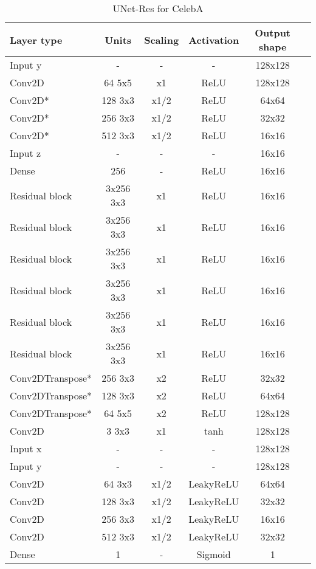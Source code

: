 \begin{table*}[h]
	\centering
	\begin{tabular}{|l|c|c|c|c|c|}
		\hline
		Layer type & Units & Scaling & Activation & Output shape\\
		\hline
		Input y & - & - & - & 128x128\\
		Conv2D & 64 5x5 & x1 & ReLU & 128x128 \\
		Conv2D* & 128 3x3 & x1/2 & ReLU & 64x64 \\
		Conv2D* & 256 3x3 & x1/2 & ReLU & 32x32 \\
		Conv2D* & 512 3x3 & x1/2 & ReLU & 16x16 \\
		Input z & - & - & - & 16x16\\
		Dense & 256 & - & ReLU & 16x16\\
		Residual block & 3x256 3x3 & x1 & ReLU & 16x16 \\
		Residual block & 3x256 3x3 & x1 & ReLU & 16x16 \\
		Residual block & 3x256 3x3 & x1 & ReLU & 16x16 \\
		Residual block & 3x256 3x3 & x1 & ReLU & 16x16 \\
		Residual block & 3x256 3x3 & x1 & ReLU & 16x16 \\
		Residual block & 3x256 3x3 & x1 & ReLU & 16x16 \\
		Conv2DTranspose* & 256 3x3 & x2 & ReLU & 32x32 \\
		Conv2DTranspose* & 128 3x3 & x2 & ReLU & 64x64 \\
		Conv2DTranspose* & 64 5x5 & x2 & ReLU & 128x128 \\
		Conv2D & 3 3x3 & x1 & tanh & 128x128 \\
		\hline
		Input x & - & - & - & 128x128\\
		Input y & - & - & - & 128x128\\
		Conv2D & 64 3x3 & x1/2 & LeakyReLU & 64x64 \\
		Conv2D & 128 3x3 & x1/2 & LeakyReLU & 32x32 \\
		Conv2D & 256 3x3 & x1/2 & LeakyReLU & 16x16 \\
		Conv2D & 512 3x3 & x1/2 & LeakyReLU & 32x32 \\
		Dense & 1 & - & Sigmoid & 1\\
		\hline
	\end{tabular}
\label{subsec:unet_celeba}
\caption{UNet-Res for CelebA}
\end{table*}
\noindent





